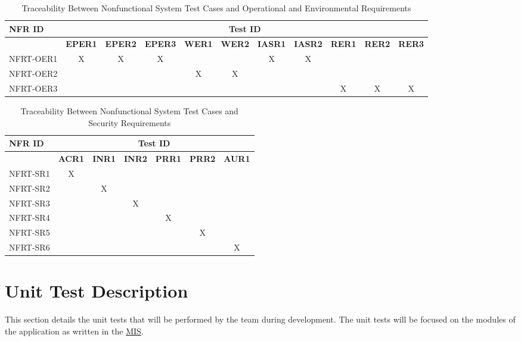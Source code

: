 \documentclass[12pt, titlepage]{article}
\begin{document}
\begin{landscape}
  \begin{longtable}{|l|cccccccccc|}
		\caption{Traceability Between Nonfunctional System Test Cases and Operational and Environmental Requirements} \\
		\hline
    \textbf{NFR ID}   & \multicolumn{10}{c|}{\textbf{Test ID}} \\
    \hline
    ~ & \textbf{EPER1} & \textbf{EPER2} & \textbf{EPER3} & \textbf{WER1} & \textbf{WER2} & \textbf{IASR1} & \textbf{IASR2} & \textbf{RER1} & \textbf{RER2} & \textbf{RER3} \\
    \hline
    NFRT-OER1 & X & X & X & ~ & ~ & X & X & ~ & ~ & ~ \\
    NFRT-OER2 & ~ & ~ & ~ & X & X & ~ & ~ & ~ & ~ & ~ \\
    NFRT-OER3 & ~ & ~ & ~ & ~ & ~ & ~ & ~ & X & X & X \\
    \hline
  \end{longtable}

  \begin{longtable}{|l|cccccc|}
		\caption{Traceability Between Nonfunctional System Test Cases and Security Requirements} \\
		\hline
    \textbf{NFR ID}   & \multicolumn{6}{c|}{\textbf{Test ID}} \\
    \hline
    ~ & \textbf{ACR1} & \textbf{INR1} & \textbf{INR2} & \textbf{PRR1} & \textbf{PRR2} & \textbf{AUR1} \\
    \hline
    NFRT-SR1 & X & ~ & ~ & ~ & ~ & ~ \\
    NFRT-SR2 & ~ & X & ~ & ~ & ~ & ~ \\
    NFRT-SR3 & ~ & ~ & X & ~ & ~ & ~ \\
    NFRT-SR4 & ~ & ~ & ~ & X & ~ & ~ \\
    NFRT-SR5 & ~ & ~ & ~ & ~ & X & ~ \\
    NFRT-SR6 & ~ & ~ & ~ & ~ & ~ & X \\
    \hline
  \end{longtable}
\end{landscape}

\section{Unit Test Description}

This section details the unit tests that will be performed by the team during development. The
unit tests will be focused on the modules of the application as written in the
\href{https://github.com/r-yeh/grocery-spending-tracker/blob/master/docs/Design/SoftDetailedDes/MIS.pdf}{MIS}.
\end{document}
